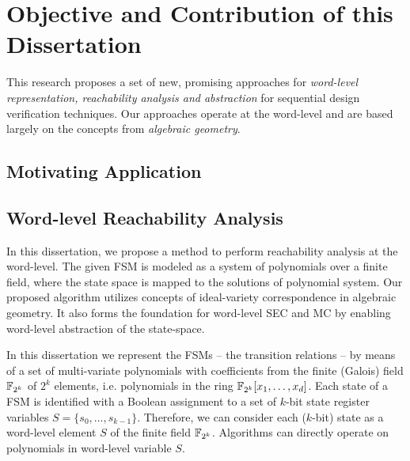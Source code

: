 \section{Objective and Contribution of this Dissertation}
This research proposes a
set of new, promising approaches for {\it word-level representation,
reachability analysis and abstraction} for sequential design verification techniques. 
Our approaches operate at the word-level and are based
largely on the concepts from {\it algebraic geometry}. 

\subsection{Motivating Application}



\subsection{Word-level Reachability Analysis}
In this dissertation, we propose a method to perform reachability analysis at the word-level. 
	The given FSM is modeled as a system of polynomials over a finite field,
	where the state space is mapped to the solutions of polynomial system.
	Our proposed algorithm utilizes concepts of ideal-variety correspondence in algebraic geometry.
	It also forms the foundation for word-level SEC and MC by enabling word-level abstraction of the
  state-space.

In this dissertation we represent
the FSMs -- the transition relations -- by means of a set of
multi-variate polynomials with coefficients from the finite (Galois)
field ${\mathbb{F}}_{2^k}$ of $2^k$ elements, i.e. polynomials in the ring
${\mathbb{F}}_{2^k}[x_1,\dots,x_d]$. Each state of a FSM is identified with a
Boolean assignment to a set of $k$-bit state register variables
$S=\{s_0,\dots,s_{k-1}\}$. Therefore, we can consider each ($k$-bit)
state as a word-level element $S$ of the finite field
${\mathbb{F}}_{2^k}$. Algorithms can directly operate on polynomials in word-level
variable $S$. 

